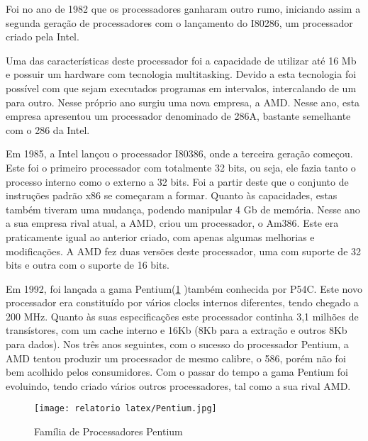 \documentclass{report}
\begin{document}
Foi no ano de 1982 que os processadores ganharam outro rumo, iniciando assim a segunda geração de processadores com o lançamento do I80286, um processador criado pela \ac{Intel}\cite{IntelH}. 



















Uma das características deste processador foi a capacidade de utilizar até 16 Mb e possuir um hardware com tecnologia multitasking. Devido a esta tecnologia foi possível com que sejam executados programas em intervalos, intercalando de um para outro\cite{Historia1}. Nesse próprio ano surgiu uma nova empresa, a \ac{AMD}. Nesse ano, esta empresa apresentou um processador denominado de 286A, bastante semelhante com o 286 da \ac{Intel}\cite{deevoluccao}.

Em 1985, a \ac{Intel} lançou o processador I80386, onde a terceira geração começou. Este foi o primeiro processador com totalmente 32 bits, ou seja, ele fazia tanto o processo interno como o externo a 32 bits. Foi a partir deste que o conjunto de instruções padrão x86 se começaram a formar. Quanto às capacidades, estas também tiveram uma mudança, podendo manipular 4 Gb de memória\cite{Historia1}. Nesse ano a sua empresa rival atual, a \ac{AMD}, criou um processador, o Am386. Este era praticamente igual ao anterior criado, com apenas algumas melhorias e modificações. A \ac{AMD} fez duas versões deste processador, uma com suporte de 32 bits e outra com o suporte de 16 bits\cite{deevoluccao}.


Em 1992, foi lançada a gama Pentium(\ref{fig:Pentium} )também conhecida por P54C. Este novo processador era constituído por vários clocks internos diferentes, tendo chegado a 200 MHz. Quanto às suas especificações este processador continha 3,1 milhões de transístores, com um cache interno e 16Kb (8Kb para a extração e outros 8Kb para dados). Nos três anos seguintes, com o sucesso do processador Pentium, a \ac{AMD} tentou produzir um processador de mesmo calibre, o 586, porém não foi bem acolhido pelos consumidores. Com o passar do tempo a gama Pentium foi evoluindo, tendo criado vários outros processadores, tal como a sua rival \ac{AMD}\cite{Historia1}\cite{deevoluccao}.

\begin{figure}[h!]
\centering
  \texttt{[image: relatorio latex/Pentium.jpg]}
  \caption{Família de Processadores Pentium}
  \label{fig:Pentium}
\end{figure}
\end{document}

